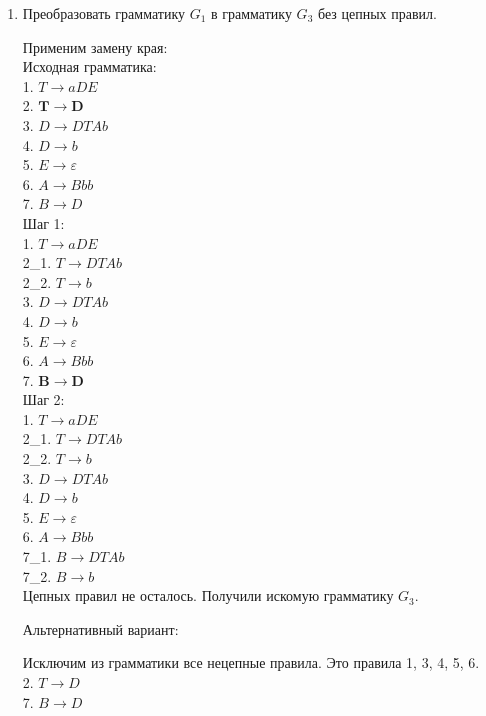 \documentclass[a4paper,14pt]{extarticle}
\begin{document}
\begin{enumerate}[1.]
\item Преобразовать грамматику $G_1$ в грамматику $G_3$ без цепных правил.

Применим замену края:\\

Исходная грамматика:\\
1. $T \rightarrow aDE$\\
2. $\mathbf{T \rightarrow D}$\\
3. $D \rightarrow DTAb$\\
4. $D \rightarrow b$\\
5. $E \rightarrow \varepsilon$\\
6. $A \rightarrow Bbb$\\
7. $B \rightarrow D$\\

Шаг 1: \\
1. $T \rightarrow aDE$\\
2\_1. $T \rightarrow DTAb$\\
2\_2. $T \rightarrow b$\\
3. $D \rightarrow DTAb$\\
4. $D \rightarrow b$\\
5. $E \rightarrow \varepsilon$\\
6. $A \rightarrow Bbb$\\
7. $\mathbf{B \rightarrow D}$\\

Шаг 2:\\
1. $T \rightarrow aDE$\\
2\_1. $T \rightarrow DTAb$\\
2\_2. $T \rightarrow b$\\
3. $D \rightarrow DTAb$\\
4. $D \rightarrow b$\\
5. $E \rightarrow \varepsilon$\\
6. $A \rightarrow Bbb$\\
7\_1. $B \rightarrow DTAb$\\
7\_2. $B \rightarrow b$\\

Цепных правил не осталось.
Получили искомую грамматику $G_3$.

Альтернативный вариант:

Исключим из грамматики все нецепные правила. Это правила 1, 3, 4, 5, 6.\\
2. $T \rightarrow D$\\
7. $B \rightarrow D$\\


\end{enumerate}
\end{document}
